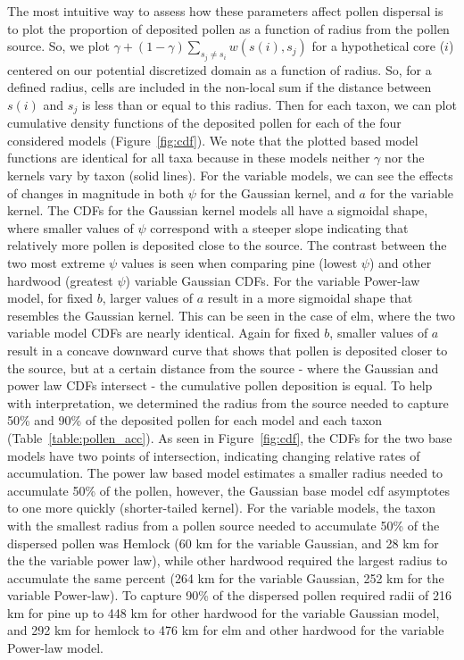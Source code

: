 \documentclass[12pt]{article}
\begin{document}
The most intuitive way to assess how these parameters affect pollen
dispersal is to plot the proportion of deposited pollen as a function
of radius from the pollen source. So, we plot $\gamma + (1- \gamma)
\sum_{s_j \neq s_i} w(s(i), s_j)$ for a hypothetical core ($i$)
centered on our potential discretized domain as a function of
radius. So, for a defined radius, cells are included in the non-local
sum if the distance between $s(i)$ and $s_j$ is less than or equal to
this radius. Then for each taxon, we can plot cumulative density
functions of the deposited pollen for each of the four considered
models (Figure~\ref{fig:cdf}). We note that the plotted based model
functions are identical for all taxa because in these models neither
$\gamma$ nor the kernels vary by taxon (solid lines).  For the
variable models, we can see the effects of changes in magnitude in
both $\psi$ for the Gaussian kernel, and $a$ for the variable
kernel. The CDFs for the Gaussian kernel models all have a sigmoidal
shape, where smaller values of $\psi$ correspond with a steeper slope
indicating that relatively more pollen is deposited close to the
source. The contrast between the two most extreme $\psi$ values is
seen when comparing pine (lowest $\psi$) and other hardwood (greatest
$\psi$) variable Gaussian CDFs. For the variable Power-law model, for
fixed $b$, larger values of $a$ result in a more sigmoidal shape that
resembles the Gaussian kernel. This can be seen in the case of elm,
where the two variable model CDFs are nearly identical. Again for
fixed $b$, smaller values of $a$ result in a concave downward curve
that shows that pollen is deposited closer to the source, but at a
certain distance from the source - where the Gaussian and power law
CDFs intersect - the cumulative pollen deposition is equal. To help
with interpretation, we determined the radius from the source needed
to capture 50\% and 90\% of the deposited pollen for each model and
each taxon (Table~\ref{table:pollen_acc}). As seen in
Figure~\ref{fig:cdf}, the CDFs for the two base models have two points
of intersection, indicating changing relative rates of
accumulation. The power law based model estimates a smaller radius
needed to accumulate 50\% of the pollen, however, the Gaussian base
model cdf asymptotes to one more quickly (shorter-tailed kernel). For
the variable models, the taxon with the smallest radius from a pollen
source needed to accumulate 50\% of the dispersed pollen was Hemlock
(60 km for the variable Gaussian, and 28 km for the the variable power
law), while other hardwood required the largest radius to accumulate
the same percent (264 km for the variable Gaussian, 252 km for the
variable Power-law). To capture 90\% of the dispersed pollen required
radii of 216 km for pine up to 448 km for other hardwood for the
variable Gaussian model, and 292 km for hemlock to 476 km for elm and
other hardwood for the variable Power-law model.
\end{document}
